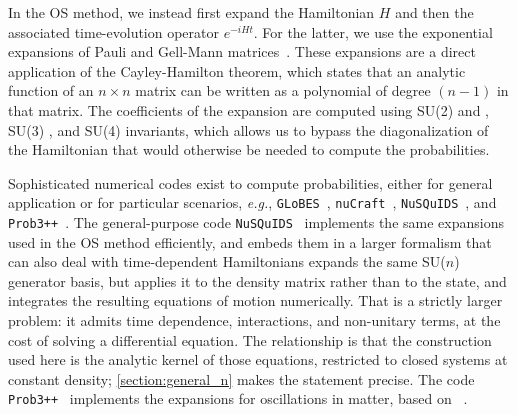 \documentclass[final,5p,times,twocolumn]{elsarticle}
\newcommand{\eg}{{\it e.g.}}
\providecommand{\Ref}{} %
\providecommand{\DIFaddtex}[1]{{\protect\color{blue} \sf #1}} %
\providecommand{\DIFdeltex}[1]{{\protect\color{red} \scriptsize #1}} %
\providecommand{\DIFaddbegin}{} %
\providecommand{\DIFaddend}{} %
\providecommand{\DIFdelbegin}{} %
\providecommand{\DIFdelend}{} %
\providecommand{\DIFadd}[1]{\DIFaddtex{#1}} %
\providecommand{\DIFdel}[1]{\DIFdeltex{#1}} %
\begin{document}
In the OS method, we instead first expand the Hamiltonian $H$ and then the associated time-evolution operator $e^{-i H t}$.  For the latter, we use the exponential expansions of Pauli and Gell-Mann matrices\ \cite{MacFarlane:1968vc, Curtright:2015iba, VanKortryk:2015kua}.  These expansions are a direct application of the Cayley-Hamilton theorem, which states that an analytic function of an $n \times n$ matrix can be written as a polynomial of degree $(n-1)$ in that matrix.  The coefficients of the expansion are computed using SU(2)\DIFdelbegin \DIFdel{and }\DIFdelend \DIFaddbegin \DIFadd{, }\DIFaddend SU(3)\DIFaddbegin \DIFadd{, and SU(4) }\DIFaddend invariants, which allows us to bypass the diagonalization of the Hamiltonian that would otherwise be needed to compute the probabilities.

Sophisticated numerical codes exist to compute probabilities, either for general application or for particular scenarios, \eg, {\tt GLoBES}\ \cite{GLoBES}, {\tt nuCraft}\ \cite{nuCraft}, {\tt NuSQuIDS}\ \cite{NuSQuIDS}, and {\tt Prob3++}\ \cite{Prob3pp}.  The general-purpose code {\tt NuSQuIDS}\ \cite{Delgado:2014kpa, NuSQuIDS} \DIFdelbegin \DIFdel{implements the same expansions used in the OS method efficiently, and embeds them in a larger formalism that can also deal with time-dependent Hamiltonians}\DIFdelend \DIFaddbegin \DIFadd{expands the same SU($n$) generator basis, but applies it to the density matrix rather than to the state, and integrates the resulting equations of motion numerically.  That is a strictly larger problem: it admits time dependence, interactions, and non-unitary terms, at the cost of solving a differential equation.  The relationship is that the construction used here is the analytic kernel of those equations, restricted to closed systems at constant density; \ref{section:general_n} makes the statement precise}\DIFaddend .  The code {\tt Prob3++}\ \cite{Prob3pp} implements the expansions for oscillations in matter, based on \Ref\ \cite{Barger:1980tf}.
\end{document}
